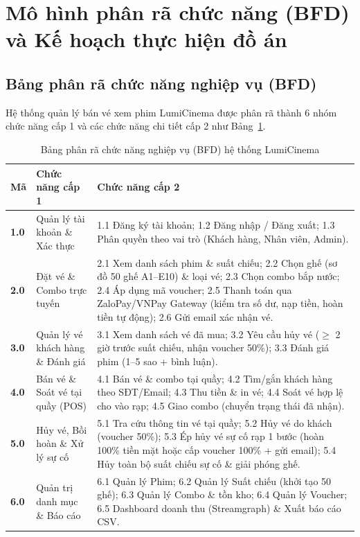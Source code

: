 \section{Mô hình phân rã chức năng (BFD) và Kế hoạch thực hiện đồ án}

\subsection{Bảng phân rã chức năng nghiệp vụ (BFD)}
Hệ thống quản lý bán vé xem phim LumiCinema được phân rã thành 6 nhóm chức năng cấp 1 và các chức năng chi tiết cấp 2 như Bảng~\ref{tab:bfd}.

\begin{longtable}{|p{1.2cm}|p{4.3cm}|p{9.8cm}|}
\caption{Bảng phân rã chức năng nghiệp vụ (BFD) hệ thống LumiCinema} \label{tab:bfd} \\
\hline
\rowcolor{headerblue} \textbf{Mã} & \textbf{Chức năng cấp 1} & \textbf{Chức năng cấp 2} \\ \hline
\endhead
\textbf{1.0} & Quản lý tài khoản \& Xác thực & 1.1 Đăng ký tài khoản; 1.2 Đăng nhập / Đăng xuất; 1.3 Phân quyền theo vai trò (Khách hàng, Nhân viên, Admin). \\ \hline
\textbf{2.0} & Đặt vé \& Combo trực tuyến & 2.1 Xem danh sách phim \& suất chiếu; 2.2 Chọn ghế (sơ đồ 50 ghế A1--E10) \& loại vé; 2.3 Chọn combo bắp nước; 2.4 Áp dụng mã voucher; 2.5 Thanh toán qua ZaloPay/VNPay Gateway (kiểm tra số dư, nạp tiền, hoàn tiền tự động); 2.6 Gửi email xác nhận vé. \\ \hline
\textbf{3.0} & Quản lý vé khách hàng \& Đánh giá & 3.1 Xem danh sách vé đã mua; 3.2 Yêu cầu hủy vé ($\ge$ 2 giờ trước suất chiếu, nhận voucher 50\%); 3.3 Đánh giá phim (1--5 sao + bình luận). \\ \hline
\textbf{4.0} & Bán vé \& Soát vé tại quầy (POS) & 4.1 Bán vé \& combo tại quầy; 4.2 Tìm/gắn khách hàng theo SĐT/Email; 4.3 Thu tiền \& in vé; 4.4 Soát vé hợp lệ cho vào rạp; 4.5 Giao combo (chuyển trạng thái đã nhận). \\ \hline
\textbf{5.0} & Hủy vé, Bồi hoàn \& Xử lý sự cố & 5.1 Tra cứu thông tin vé tại quầy; 5.2 Hủy vé do khách (voucher 50\%); 5.3 Ép hủy vé sự cố rạp 1 bước (hoàn 100\% tiền mặt hoặc cấp voucher 100\% + gửi email); 5.4 Hủy toàn bộ suất chiếu sự cố \& giải phóng ghế. \\ \hline
\textbf{6.0} & Quản trị danh mục \& Báo cáo & 6.1 Quản lý Phim; 6.2 Quản lý Suất chiếu (khởi tạo 50 ghế); 6.3 Quản lý Combo \& tồn kho; 6.4 Quản lý Voucher; 6.5 Dashboard doanh thu (Streamgraph) \& Xuất báo cáo CSV. \\ \hline
\end{longtable}

